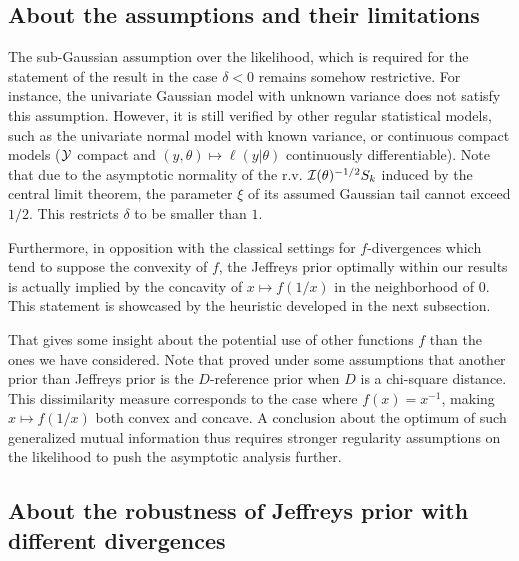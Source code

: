     \subsection{About the assumptions and their limitations}

    The sub-Gaussian assumption over the likelihood, which is required for the statement of the result in the case $\delta<0$
    remains somehow restrictive. For instance,
    the univariate Gaussian model with unknown variance does not satisfy this assumption. 
    However, 
    it is still verified by other regular statistical models, such as the
     univariate normal model with known variance, or continuous compact models ($\mathcal{Y}$ compact and $(y,\theta)\mapsto\ell(y|\theta)$ continuously differentiable). {Note that due to the asymptotic normality of the r.v. $\mathcal{I}(\theta)^{-1/2}S_k$ induced by the central limit theorem, the parameter $\xi$ of its assumed Gaussian tail cannot exceed $1/2$. This restricts $\delta$ to be smaller than $1$.}

Furthermore, %
in opposition with the classical settings for $f$-divergences which tend to suppose the convexity of $f$, the Jeffreys prior optimally within our results is actually implied by the concavity of $x\mapsto f(1/x)$ in the neighborhood of $0$.
This statement is showcased by the heuristic developed in the next subsection.

That gives some insight about the potential use of other functions $f$ than the ones we have considered.
Note that \citet{clarke_reference_1997} proved under some assumptions that another prior than Jeffreys prior is the $D$-reference prior when $D$ is a chi-square distance. This dissimilarity measure corresponds to the case where $f(x)=x^{-1}$, making $x\mapsto f(1/x)$ both convex and concave. 
A conclusion about the optimum of such generalized
mutual information thus requires stronger regularity assumptions on the likelihood to push
the asymptotic analysis further. %



    \subsection{About the robustness of Jeffreys prior with different divergences}


